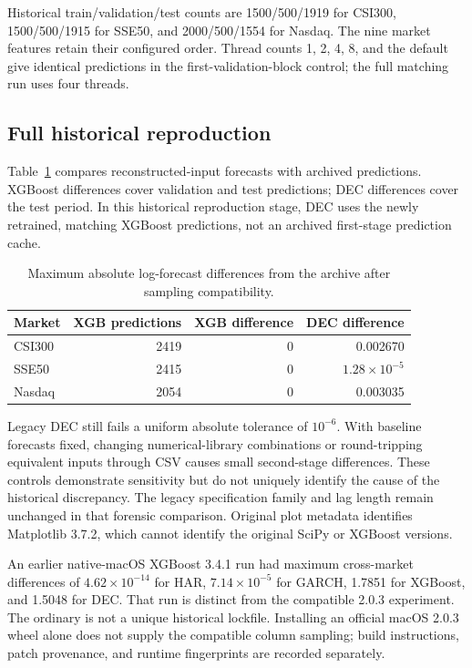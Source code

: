Historical train/validation/test counts are 1500/500/1919 for CSI300, 1500/500/1915 for SSE50, and 2000/500/1554 for Nasdaq. The nine market features retain their configured order. Thread counts 1, 2, 4, 8, and the default give identical predictions in the first-validation-block control; the full matching run uses four threads.

\subsection{Full historical reproduction}
Table~\ref{tab:reproduction_difference} compares reconstructed-input forecasts with archived predictions. XGBoost differences cover validation and test predictions; DEC differences cover the test period. In this historical reproduction stage, DEC uses the newly retrained, matching XGBoost predictions, not an archived first-stage prediction cache.

\begin{table}[htbp]\centering
\caption{Maximum absolute log-forecast differences from the archive after sampling compatibility.}
\label{tab:reproduction_difference}
\begin{tabular}{lrrr}\toprule Market & XGB predictions & XGB difference & DEC difference\\\midrule
CSI300 & 2419 & 0 & 0.002670\\
SSE50 & 2415 & 0 & $1.28\times10^{-5}$\\
Nasdaq & 2054 & 0 & 0.003035\\\bottomrule
\end{tabular}
\end{table}

Legacy DEC still fails a uniform absolute tolerance of $10^{-6}$. With baseline forecasts fixed, changing numerical-library combinations or round-tripping equivalent inputs through CSV causes small second-stage differences. These controls demonstrate sensitivity but do not uniquely identify the cause of the historical discrepancy. The legacy specification family and lag length remain unchanged in that forensic comparison. Original plot metadata identifies Matplotlib 3.7.2, which cannot identify the original SciPy or XGBoost versions.

An earlier native-macOS XGBoost 3.4.1 run had maximum cross-market differences of $4.62\times10^{-14}$ for HAR, $7.14\times10^{-5}$ for GARCH, 1.7851 for XGBoost, and 1.5048 for DEC. That run is distinct from the compatible 2.0.3 experiment. The ordinary  is not a unique historical lockfile. Installing an official macOS 2.0.3 wheel alone does not supply the compatible column sampling; build instructions, patch provenance, and runtime fingerprints are recorded separately.

